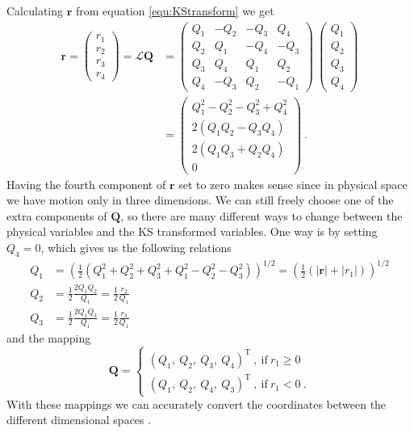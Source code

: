 \documentclass[english, oneside]{HYgradu}
\begin{document}
Calculating $\mathbf{r}$ from equation \ref{equ:KStransform} we get
\begin{align}
\mathbf{r} = 
\begin{pmatrix}
r_1 \\
r_2 \\
r_3 \\
r_4
\end{pmatrix}
= \mathcal{L} \mathbf{Q} &=
\begin{pmatrix}
Q_1 & -Q_2 & -Q_3 & Q_4 \\
Q_2 & Q_1 & -Q_4 & -Q_3 \\
Q_3 & Q_4 & Q_1 & Q_2 \\
Q_4 & -Q_3 & Q_2 & -Q_1
\end{pmatrix} \ 
\begin{pmatrix}
Q_1 \\
Q_2 \\
Q_3 \\
Q_4
\end{pmatrix}
\nonumber \\
&= 
\begin{pmatrix}
Q_1^2 - Q_2^2 - Q_3^2 + Q_4^2 \\
2(Q_1 Q_2 - Q_3 Q_4) \\
2(Q_1 Q_3 + Q_2 Q_4) \\
0
\end{pmatrix} \ .
\end{align}
Having the fourth component of $\mathbf{r}$ set to zero makes sense since in physical space we have motion only in three dimensions.
We can still freely choose one of the extra components of $\mathbf{Q}$, so there are many different ways to change between the physical variables and the KS transformed variables. One way is by setting $Q_4 = 0$, which gives us the following relations
\begin{align}
Q_1 &= \left( \frac{1}{2} (Q_1^2 + Q_2^2 + Q_3^2 + Q_1^2 - Q_2^2 - Q_3^2) \right)^{1/2} = \left( \frac{1}{2} ( \left| \mathbf{r} \right| + \left| r_1 \right| ) \right)^{1/2} \nonumber \\
Q_2 &= \frac{1}{2} \frac{2 Q_1 Q_2}{Q_1} = \frac{1}{2} \frac{r_2}{Q_1} \\
Q_3 &= \frac{1}{2} \frac{2 Q_1 Q_3}{Q_1} = \frac{1}{2} \frac{r_3}{Q_1} \nonumber \ 
\end{align}
and the mapping
\begin{equation}
\mathbf{Q} = 
\begin{cases}
\left( Q_1, \ Q_2, \ Q_3, \ Q_4 \right)^\mathrm{T} \ , \ \mathrm{if} \ r_1 \geq 0 \\
\left( Q_1, \ Q_2, \ Q_4, \ Q_3 \right)^\mathrm{T} \ , \ \mathrm{if} \ r_1 < 0 \ .
\end{cases}
\end{equation}
With these mappings we can accurately convert the coordinates between the different dimensional spaces \citep{diplomarbeit, ad}.
\end{document}
